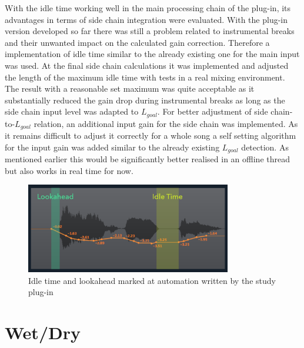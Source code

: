 With the idle time working well in the main processing chain of the plug-in, its advantages in terms of side chain integration were evaluated. With the plug-in version developed so far there was still a problem related to instrumental breaks and their unwanted impact on the calculated gain correction. Therefore a implementation of idle time similar to the already existing one for the main input was used. At the final side chain calculations it was implemented and adjusted the length of the maximum idle time with tests in a real mixing environment. The result with a reasonable set maximum was quite acceptable as it substantially reduced the gain drop during instrumental breaks as long as the side chain input level was adapted to $L_{goal}$. For better adjustment of side chain-to-$L_{goal}$ relation, an additional input gain for the side chain was implemented. As it remains difficult to adjust it correctly for a whole song a self setting algorithm for the input gain was added similar to the already existing $L_{goal}$ detection. As mentioned earlier this would be significantly better realised in an offline thread but also works in real time for now.\\

\begin{figure}[H]
\includegraphics[width=0.8\textwidth]{images/automation2LookIdle}
	\centering
	\caption{Idle time and lookahead marked at automation written by the study plug-in}
	\label{auto2look}
\end{figure}

\section{Wet/Dry}

